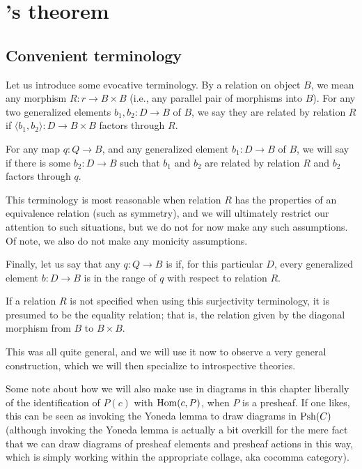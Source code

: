 \section{\Loeb's theorem}

\subsection{Convenient terminology}
Let us introduce some evocative terminology. By a relation on object $B$, we mean any morphism $R : r \to B \times B$ (i.e., any parallel pair of morphisms into $B$). For any two generalized elements $b_1, b_2 : D \to B$ of $B$, we say they are related by relation $R$ if $\langle b_1, b_2 \rangle : D \to B \times B$ factors through $R$.

For any map $q: Q \to B$, and any generalized element $b_1 : D \to B$ of $B$, we will say  if there is some $b_2 : D \to B$ such that $b_1$ and $b_2$ are related by relation $R$ and $b_2$ factors through $q$.

This terminology is most reasonable when relation $R$ has the properties of an equivalence relation (such as symmetry), and we will ultimately restrict our attention to such situations, but we do not for now make any such assumptions. Of note, we also do not make any monicity assumptions.

Finally, let us say that any $q : Q \to B$ is  if, for this particular $D$, every generalized element $b : D \to B$ is in the range of $q$ with respect to relation $R$.

If a relation $R$ is not specified when using this surjectivity terminology, it is presumed to be the equality relation; that is, the relation given by the diagonal morphism from $B$ to $B \times B$.

This was all quite general, and we will use it now to observe a very general construction, which we will then specialize to introspective theories.

\begin{TODOblock}
Some note about how we will also make use in diagrams in this chapter liberally of the identification of $P(c)$ with $\operatorname{Hom}(c, P)$, when $P$ is a presheaf. If one likes, this can be seen as invoking the Yoneda lemma to draw diagrams in $\operatorname{Psh}(C)$ (although invoking the Yoneda lemma is actually a bit overkill for the mere fact that we can draw diagrams of presheaf elements and presheaf actions in this way, which is simply working within the appropriate collage, aka cocomma category).
\end{TODOblock}

